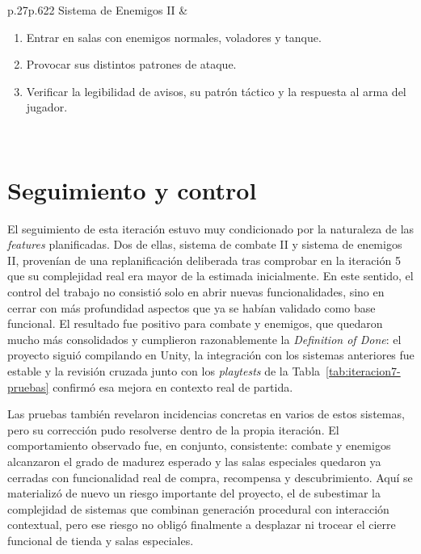 \begin{table}[!htbp]
\begin{coolTable}{p{.27\textwidth}p{.62\textwidth}}{2}
    \midrule
    Sistema de Enemigos II & \begin{minipage}[t]{\linewidth}\begin{enumerate}\item Entrar en salas con enemigos normales, voladores y tanque. \item Provocar sus distintos patrones de ataque. \item Verificar la legibilidad de avisos, su patrón táctico y la respuesta al arma del jugador.\end{enumerate}\end{minipage} \\
    \end{coolTable}
    \caption{Pruebas de playtest realizadas en la iteración 7.}
    \label{tab:iteracion7-pruebas}
\end{table}

\section{Seguimiento y control}
El seguimiento de esta iteración estuvo muy condicionado por la naturaleza de las
\textit{features} planificadas. Dos de ellas, sistema de combate II y sistema de enemigos II,
provenían de una replanificación deliberada tras comprobar en la iteración 5 que su
complejidad real era mayor de la estimada inicialmente. En este sentido, el control del
trabajo no consistió solo en abrir nuevas funcionalidades, sino en cerrar con más profundidad
aspectos que ya se habían validado como base funcional. El resultado fue positivo para combate
y enemigos, que quedaron mucho más consolidados y cumplieron razonablemente la
\textit{Definition of Done}: el proyecto siguió compilando en Unity, la integración con los
sistemas anteriores fue estable y la revisión cruzada junto con los \textit{playtests} de la
Tabla~\ref{tab:iteracion7-pruebas} confirmó esa mejora en contexto real de partida.

Las pruebas también revelaron incidencias concretas en varios de estos sistemas, pero su
corrección pudo resolverse dentro de la propia iteración. El comportamiento observado fue, en
conjunto, consistente: combate y enemigos alcanzaron el grado de madurez esperado y las salas
especiales quedaron ya cerradas con funcionalidad real de compra, recompensa y descubrimiento.
Aquí se materializó de nuevo un riesgo importante del proyecto, el de subestimar la
complejidad de sistemas que combinan generación procedural con interacción contextual, pero
ese riesgo no obligó finalmente a desplazar ni trocear el cierre funcional de tienda y salas
especiales.

